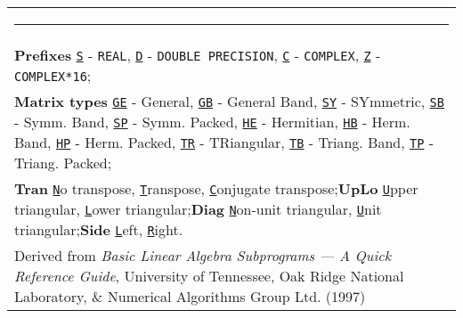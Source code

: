\documentclass[10pt,a3paper, landscape]{article}
\newcommand{\key}[1]{\underline{\texttt{#1}}}
\begin{document}
\begin{tabular}{lll}
		\multicolumn{3}{l}{\small\rule{2cm}{1pt}}                                                                                                                                                                                                                                                                                                                                                                                                               \\
		\multicolumn{3}{l}{\small\textbf{Prefixes}\; \key{S} - \texttt{REAL}, \key{D} - \texttt{DOUBLE PRECISION}, \key{C} - \texttt{COMPLEX}, \key{Z} - \texttt{COMPLEX*16};}                                                                                                                                                                                                                                                                                  \\
		\multicolumn{3}{l}{\small\textbf{Matrix types}\; \key{GE} - General, \key{GB} - General Band, \key{SY} -  SYmmetric, \key{SB} - Symm. Band, \key{SP} - Symm. Packed, \key{HE} - Hermitian, \key{HB} - Herm. Band, \key{HP} - Herm. Packed, \key{TR} - TRiangular, \key{TB} - Triang. Band, \key{TP} - Triang. Packed;}                                                                                                                                  \\
		\multicolumn{3}{l}{\small\textbf{Tran}\; \key{N}o transpose, \key{T}ranspose, \key{C}onjugate transpose;\quad \textbf{UpLo}\; \key{U}pper triangular, \key{L}ower triangular;\quad\textbf{Diag}\; \key{N}on-unit triangular, \key{U}nit triangular;\quad\textbf{Side}\; \key{L}eft, \key{R}ight.}                                                                                                                                                       \\                                                                                                                                                                                                                                                                                                                                                                                                                            
		\multicolumn{3}{l}{\scriptsize Derived from \emph{Basic Linear Algebra Subprograms --- A Quick Reference Guide}, University of Tennessee, Oak Ridge National Laboratory, \& Numerical Algorithms Group Ltd. (1997)}                                                                                                                                                                                                                             
	\end{tabular}
		

	
	
	
	
\end{document}
